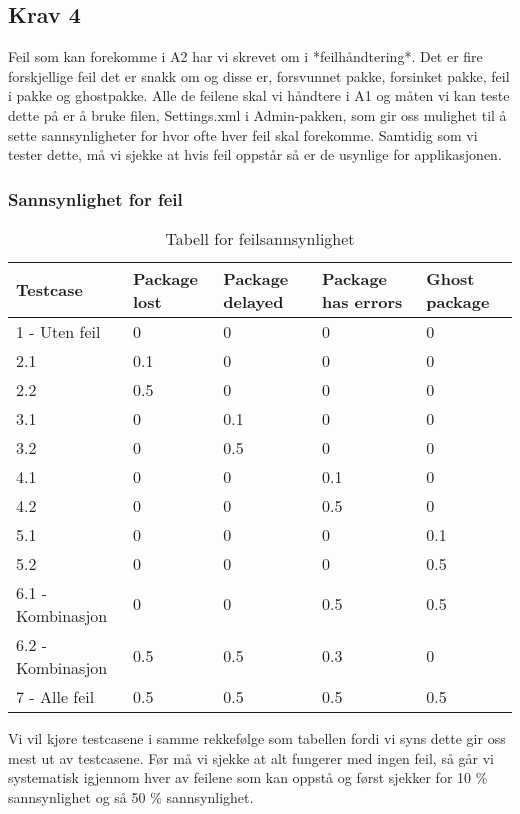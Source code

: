 \subsection{Krav 4}
Feil som kan forekomme i A2 har vi skrevet om i *feilhåndtering*. Det er fire forskjellige feil det er snakk om og disse er, forsvunnet pakke, forsinket pakke, feil i pakke og ghostpakke. 
Alle de feilene skal vi håndtere i A1 og måten vi kan teste dette på er å bruke filen, Settings.xml i Admin-pakken, som gir oss mulighet til å sette sannsynligheter for hvor ofte hver feil skal forekomme. Samtidig som vi tester dette, må vi sjekke at hvis feil oppstår så er de usynlige for applikasjonen.

\subsubsection{Sannsynlighet for feil}
\begin{table}[H]
\centering
\label{tab:feilsan}
\begin{tabular}{| l | l | l | l | l |}
\hline
Testcase & Package lost & Package delayed & Package has errors & Ghost package \\
\hline
1 - Uten feil & 0 & 0 & 0 & 0 \\
\hline
2.1 & 0.1 & 0 & 0 & 0 \\
\hline
2.2 & 0.5 & 0 & 0 & 0 \\
\hline
3.1 & 0 & 0.1 & 0 & 0 \\
\hline
3.2 & 0 & 0.5 & 0 & 0 \\
\hline
4.1 & 0 & 0 & 0.1 & 0 \\
\hline
4.2 & 0 & 0 & 0.5 & 0 \\
\hline
5.1 & 0 & 0 & 0 & 0.1 \\
\hline
5.2 & 0 & 0 & 0 & 0.5 \\
\hline
6.1 - Kombinasjon & 0 & 0 & 0.5 & 0.5 \\
\hline
6.2 - Kombinasjon & 0.5 & 0.5 & 0.3 & 0 \\
\hline
7 - Alle feil & 0.5 & 0.5 & 0.5 & 0.5 \\
\hline
\end{tabular}
\caption{Tabell for feilsannsynlighet}
\end{table}

Vi vil kjøre testcasene i samme rekkefølge som tabellen fordi vi syns dette gir oss mest ut av testcasene. Før må vi sjekke at alt fungerer med ingen feil, så går vi systematisk igjennom hver av feilene som kan oppstå og først sjekker for 10 \% sannsynlighet og så 50 \% sannsynlighet.

